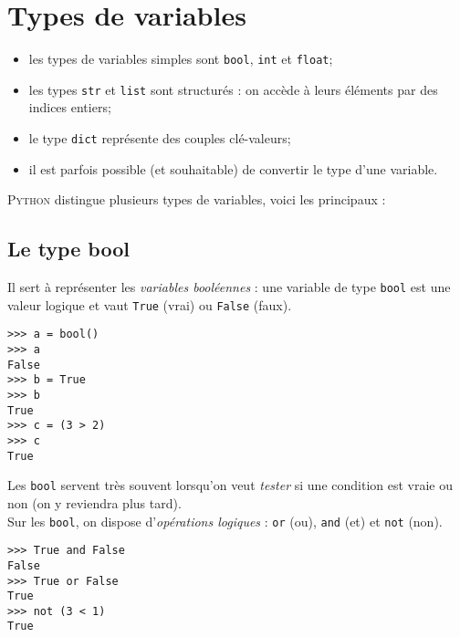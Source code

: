 \chapter{Types de variables}
\label{ch:types}
\begin{aretenir}
    \begin{itemize}
        \item 	les types de variables simples sont \texttt{bool}, \texttt{int} et \texttt{float};
        \item 	les types \texttt{str} et \texttt{list} sont structurés : on accède à leurs éléments par des indices entiers;
        \item 	le type \texttt{dict} représente des couples \og clé-valeurs\fg{};
        \item 	il est parfois possible (et souhaitable) de convertir le type d'une variable.
    \end{itemize}
\end{aretenir}
\textsc{Python} distingue plusieurs types de variables, voici les principaux :
\section{Le type bool}
Il sert à représenter les \textit{variables booléennes} : une variable de type \texttt{bool} est une valeur logique et vaut \texttt{True} (vrai) ou
\texttt{False} (faux).


\begin{pys}\begin{verbatim}
>>> a = bool()
>>> a
False
>>> b = True
>>> b
True
>>> c = (3 > 2)
>>> c
True
\end{verbatim}
\end{pys}

Les \texttt{bool} servent très souvent lorsqu'on veut \textit{tester} si une condition est vraie ou non (on y reviendra plus tard).\\
Sur les \texttt{bool}, on dispose d'\textit{opérations logiques} : \texttt{or} (ou), \texttt{and} (et) et \texttt{not} (non).

\begin{pys}\begin{verbatim}
>>> True and False
False
>>> True or False
True
>>> not (3 < 1)
True
\end{verbatim}
\end{pys}

